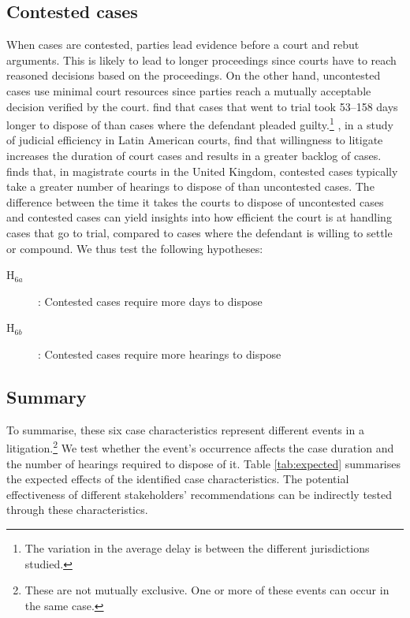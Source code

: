 \documentclass[12pt,a4paper]{article}
\begin{document}
\subsection{Contested cases}
\label{sec:contested_cases_meth}
When cases are contested, parties lead evidence before a court and rebut arguments. This is likely to lead to longer proceedings since courts have to reach reasoned decisions based on the proceedings. On the other hand, uncontested cases use minimal court resources since parties reach a mutually acceptable decision verified by the court. \textcite{ostrom2000efficiency} find that cases that went to trial took 53--158 days longer to dispose of than cases where the defendant pleaded guilty.\footnote{The variation in the average delay is between the different jurisdictions studied.} \textcite{buscaglia1997_latinAmericaCourtDelays}, in a study of judicial efficiency in Latin American courts, find that willingness to litigate increases the duration of court cases and results in a greater backlog of cases. \textcite{crownProsecutionService2006_magistrateCourtEfficiency} finds that, in magistrate courts in the United Kingdom, contested cases typically take a greater number of hearings to dispose of than uncontested cases. The difference between the time it takes the courts to dispose of uncontested cases and contested cases can yield insights into how efficient the court is at handling cases that go to trial, compared to cases where the defendant is willing to settle or compound. We thus test the following hypotheses:

\begin{description}
\item[H$_{6a}$]: Contested cases require more days to dispose
\item[H$_{6b}$]: Contested cases require more hearings to dispose
\end{description}

\subsection{Summary}

To summarise, these six case characteristics represent different events in a litigation.\footnote{These are not mutually exclusive. One or more of these events can occur in the same case.} We test whether the event's occurrence affects the case duration and the number of hearings required to dispose of it. Table \ref{tab:expected} summarises the expected effects of the identified case characteristics. The potential effectiveness of different stakeholders' recommendations can be indirectly tested through these characteristics.
\end{document}

